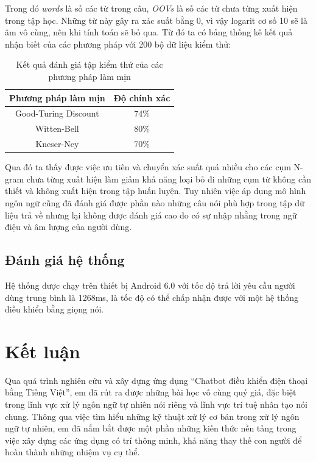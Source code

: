 \documentclass[12pt]{report}
\begin{document}
Trong đó \textit{words} là số các từ trong câu, \textit{OOVs} là số các từ chưa từng xuất hiện trong tập học. Những từ này gây ra xác suất bằng 0, vì vậy logarit cơ số 10 sẽ là âm vô cùng, nên khi tính toán sẽ bỏ qua. Từ đó ta có bảng thống kê kết quả nhận biết của các phương pháp với 200 bộ dữ liệu kiểm thử:
\begin{table}[h]
	\caption{Kết quả đánh giá tập kiểm thử của các phương pháp làm mịn}
	\centering
	\begin{tabular}{ | c | c | }
	\hline
	Phương pháp làm mịn & Độ chính xác \\
	\hline
	Good-Turing Discount & 74\% \\
	\hline
	Witten-Bell & 80\% \\
	\hline
	Kneser-Ney & 70\% \\
	\hline
	\end{tabular}
\end{table}

Qua đó ta thấy được việc ưu tiên và chuyển xác suất quá nhiều cho các cụm N-gram chưa từng xuất hiện làm giảm khả năng loại bỏ đi những cụm từ không cần thiết và không xuất hiện trong tập huấn luyện. Tuy nhiên việc áp dụng mô hình ngôn ngữ cũng đã đánh giá được phần nào những câu nói phù hợp trong tập dữ liệu trả về nhưng lại không được đánh giá cao do có sự nhập nhằng trong ngữ điệu và âm lượng của người dùng. 

\section{Đánh giá hệ thống}

Hệ thống được chạy trên thiết bị Android 6.0 với tốc độ trả lời yêu cầu người dùng trung bình là 1268ms, là tốc độ có thể chấp nhận được với một hệ thống điều khiển bằng giọng nói.

\stopcontents[parts]

\chapter*{Kết luận}

Qua quá trình nghiên cứu và xây dựng ứng dụng ``Chatbot điều khiển điện thoại bằng Tiếng Việt'', em đã rút ra được những bài học vô cùng quý giá, đặc biệt trong lĩnh vực xử lý ngôn ngữ tự nhiên nói riêng và lĩnh vực trí tuệ nhân tạo nói chung. Thông qua việc tìm hiểu những kỹ thuật xử lý cơ bản trong xử lý ngôn ngữ tự nhiên, em đã nắm bắt được một phần những kiến thức nền tảng trong việc xây dựng các ứng dụng có trí thông minh, khả năng thay thế con người để hoàn thành những nhiệm vụ cụ thể.
\end{document}
